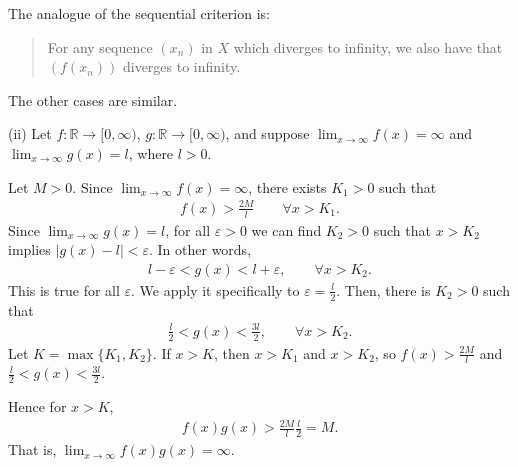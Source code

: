 \documentclass[letterpaper,10pt,english]{jupyterBook}
\begin{document}
\sphinxAtStartPar
The analogue of the sequential criterion is:
\begin{quote}

\sphinxAtStartPar
For any sequence \((x_{n})\) in \(X\) which diverges to infinity, we also have that \((f(x_{n}))\) diverges to infinity.
\end{quote}

\sphinxAtStartPar
The other cases are similar.

\sphinxAtStartPar
(ii) Let \(f:\mathbb{R}\to[0,\infty)\), \(g:\mathbb{R}\to[0,\infty)\), and suppose \(\displaystyle\lim_{x\rightarrow\infty}f(x)=\infty\) and \(\displaystyle\lim_{x\rightarrow\infty}g(x)=l\), where \(l>0\).

Let \(M > 0\). Since \(\lim_{x\rightarrow\infty}f(x)=\infty\), there exists \(K_1 > 0\) such that
\begin{equation*}
\begin{split}
f(x)>\frac{2M}{l} \hspace{2em} \forall x > K_1.
\end{split}
\end{equation*}
\sphinxAtStartPar
Since \(\lim_{x\rightarrow\infty}g(x)=l\), for all \(\varepsilon>0\) we can find \(K_2>0\) such that \(x>K_2\) implies \(|g(x)-l|<\varepsilon\). In other words,
\begin{equation*}
\begin{split}
l-\varepsilon < g(x) < l+\varepsilon, \hspace{2em} \forall x>K_2.
\end{split}
\end{equation*}
\sphinxAtStartPar
This is true for all \(\varepsilon\). We apply it specifically to \(\varepsilon = \frac{l}{2}\). Then, there is \(K_2>0\) such that
\begin{equation*}
\begin{split}
\frac{l}{2} < g(x) < \frac{3l}{2}, \hspace{2em} \forall x>K_2.
\end{split}
\end{equation*}
\sphinxAtStartPar
Let \(K=\max\{K_1,K_2\}\). If \(x>K\), then \(x>K_1\) and \(x>K_2\), so \(f(x)>\frac{2M}{l}\) and \(\frac{l}{2} < g(x) < \frac{3l}{2}\).

Hence for \(x>K\),
\begin{equation*}
\begin{split}
f(x)g(x) > \frac{2M}{l}\frac{l}{2} = M.
\end{split}
\end{equation*}
\sphinxAtStartPar
That is, \(\lim_{x\rightarrow\infty}f(x)g(x) = \infty\).
\end{document}
